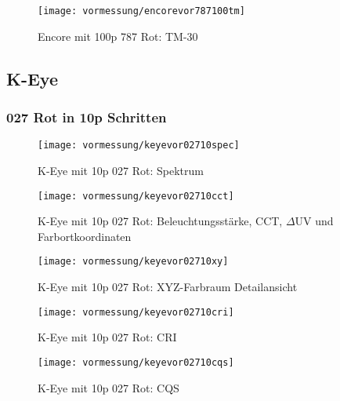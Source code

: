 \documentclass[pagesize,paper=A4,fontsize=12pt,utf8,numbers=noenddot,bibliography=totoc,listof=totoc,DIV=11,BCOR=1mm]{scrreprt}
\begin{document}
\begin{figure}[htp]     %
\centering
\texttt{[image: vormessung/encorevor787100tm]} 
\caption {Encore mit 100p 787 Rot: TM-30} 
\end{figure}



\subsection{K-Eye}

\subsubsection{027 Rot in 10p Schritten}

\begin{figure}[htp]     %
\centering
\texttt{[image: vormessung/keyevor02710spec]} 
\caption {K-Eye mit 10p 027 Rot: Spektrum} 
\end{figure}

\begin{figure}[htp]     %
\centering
\texttt{[image: vormessung/keyevor02710cct]} 
\caption {K-Eye mit 10p 027 Rot: Beleuchtungsstärke, CCT, $\Delta$UV und Farbortkoordinaten} 
\end{figure}

\begin{figure}[htp]     %
\centering
\texttt{[image: vormessung/keyevor02710xy]} 
\caption {K-Eye mit 10p 027 Rot: XYZ-Farbraum Detailansicht} 
\end{figure}

\begin{figure}[htp]     %
\centering
\texttt{[image: vormessung/keyevor02710cri]} 
\caption {K-Eye mit 10p 027 Rot: CRI} 
\end{figure}

\begin{figure}[htp]     %
\centering
\texttt{[image: vormessung/keyevor02710cqs]} 
\caption {K-Eye mit 10p 027 Rot: CQS} 
\end{figure}
\end{document}
